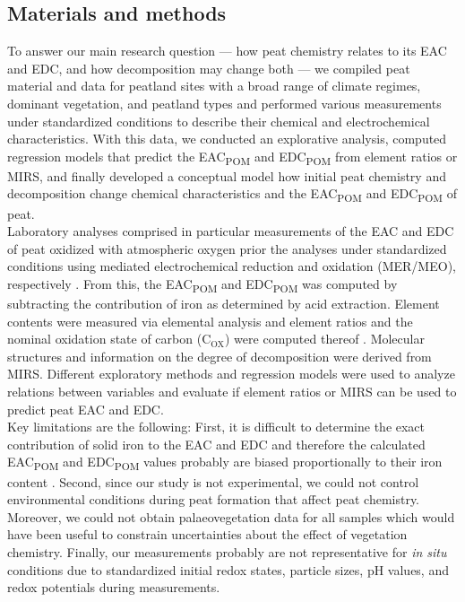 \documentclass[alpha-refs]{wiley-article-rmd}
\begin{document}
\begin{refsection}
\hypertarget{materials-and-methods}{%
\section{Materials and methods}\label{materials-and-methods}}

To answer our main research question --- how peat chemistry relates to its EAC and EDC, and how decomposition may change both --- we compiled peat material and data for peatland sites with a broad range of climate regimes, dominant vegetation, and peatland types and performed various measurements under standardized conditions to describe their chemical and electrochemical characteristics. With this data, we conducted an explorative analysis, computed regression models that predict the EAC\textsubscript{POM} and EDC\textsubscript{POM} from element ratios or MIRS, and finally developed a conceptual model how initial peat chemistry and decomposition change chemical characteristics and the EAC\textsubscript{POM} and EDC\textsubscript{POM} of peat.\\
Laboratory analyses comprised in particular measurements of the EAC and EDC of peat oxidized with atmospheric oxygen prior the analyses under standardized conditions using mediated electrochemical reduction and oxidation (MER/MEO), respectively \autocite{Aeschbacher.2010,Lau.2015}. From this, the EAC\textsubscript{POM} and EDC\textsubscript{POM} was computed by subtracting the contribution of iron as determined by acid extraction.
Element contents were measured via elemental analysis and element ratios and the nominal oxidation state of carbon (C\(_\text{OX}\)) were computed thereof \autocite{Masiello.2008,Worrall.2017}. Molecular structures and information on the degree of decomposition were derived from MIRS. Different exploratory methods and regression models were used to analyze relations between variables and evaluate if element ratios or MIRS can be used to predict peat EAC and EDC.\\
Key limitations are the following: First, it is difficult to determine the exact contribution of solid iron to the EAC and EDC and therefore the calculated EAC\textsubscript{POM} and EDC\textsubscript{POM} values probably are biased proportionally to their iron content \autocite{Lau.2015}.
Second, since our study is not experimental, we could not control environmental conditions during peat formation that affect peat chemistry. Moreover, we could not obtain palaeovegetation data for all samples which would have been useful to constrain uncertainties about the effect of vegetation chemistry. Finally, our measurements probably are not representative for \emph{in situ} conditions due to standardized initial redox states, particle sizes, pH values, and redox potentials during measurements.\\

\end{refsection}
\end{document}
